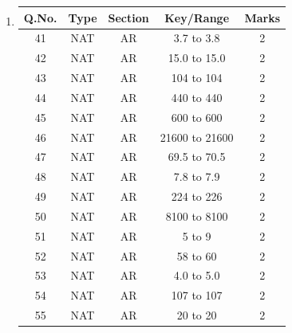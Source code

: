 \documentclass[journal,15pt,onecolumn]{IEEEtran}
\theoremstyle{remark}
\begin{document}
\begin{enumerate}
\renewcommand{\arraystretch}{2.2} %
\setlength{\tabcolsep}{20pt} %
\item
\begin{tabular}{|c|c|c|c|c|}
\hline
\rowcolor{orange!30}
Q.No. & Type & Section & Key/Range & Marks \\
\hline
41 & NAT & AR & 3.7 to 3.8 & 2 \\
\hline
42 & NAT & AR & 15.0 to 15.0 & 2 \\
\hline
43 & NAT & AR & 104 to 104 & 2 \\
\hline
44 & NAT & AR & 440 to 440 & 2 \\
\hline
45 & NAT & AR & 600 to 600 & 2 \\
\hline
46 & NAT & AR & 21600 to 21600 & 2 \\
\hline
47 & NAT & AR & 69.5 to 70.5 & 2 \\
\hline
48 & NAT & AR & 7.8 to 7.9 & 2 \\
\hline
49 & NAT & AR & 224 to 226 & 2 \\
\hline
50 & NAT & AR & 8100 to 8100 & 2 \\
\hline
51 & NAT & AR & 5 to 9 & 2 \\
\hline
52 & NAT & AR & 58 to 60 & 2 \\
\hline
53 & NAT & AR & 4.0 to 5.0 & 2 \\
\hline
54 & NAT & AR & 107 to 107 & 2 \\
\hline
55 & NAT & AR & 20 to 20 & 2 \\
\hline
\end{tabular}
\end{enumerate}
\end{document}
